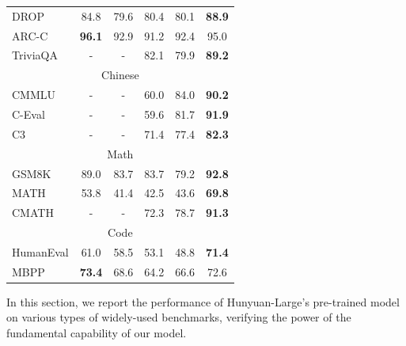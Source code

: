 \documentclass{article}
\begin{document}
\begin{table}[!hbtp]
{\begin{tabular}{lccccc}
DROP                & 84.8          & 79.6         & 80.4          & 80.1        & \textbf{88.9} \\
ARC-C               & \textbf{96.1} & 92.9         & 91.2          & 92.4        & 95.0          \\
TriviaQA            & -             & -            & 82.1          & 79.9        & \textbf{89.2} \\ \hline
\multicolumn{6}{c}{Chinese}                                                                      \\
CMMLU               & -             & -            & 60.0          & 84.0        & \textbf{90.2} \\
C-Eval              & -             & -            & 59.6          & 81.7        & \textbf{91.9} \\
C3                  & -             & -            & 71.4          & 77.4        & \textbf{82.3} \\ \hline
\multicolumn{6}{c}{Math}                                                                         \\
GSM8K               & 89.0          & 83.7         & 83.7          & 79.2        & \textbf{92.8} \\
MATH                & 53.8          & 41.4         & 42.5          & 43.6        & \textbf{69.8} \\
CMATH               & -             & -            & 72.3          & 78.7        & \textbf{91.3} \\ \hline
\multicolumn{6}{c}{Code}                                                                         \\
HumanEval           & 61.0          & 58.5            & 53.1          & 48.8        & \textbf{71.4} \\
MBPP                & \textbf{73.4}          & 68.6         & 64.2          & 66.6        & 72.6 \\ 
\bottomrule
\end{tabular}
	}
	\label{tab:main_pre_train}
\end{table}

In this section, we report the performance of Hunyuan-Large's pre-trained model on various types of widely-used benchmarks, verifying the power of the fundamental capability of our model.
\end{document}
